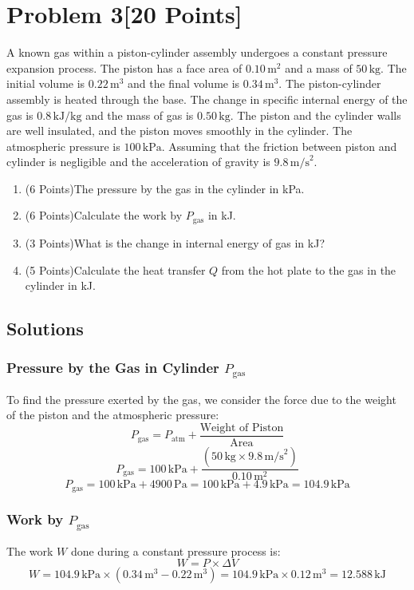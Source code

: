 \documentclass{article}
\begin{document}
\section*{Problem 3[20 Points]}
A known gas within a piston-cylinder assembly undergoes a constant pressure expansion process. The piston has a face area of \(0.10 \, \text{m}^2\) and a mass of \(50 \, \text{kg}\). The initial volume is \(0.22 \, \text{m}^3\) and the final volume is \(0.34 \, \text{m}^3\). The piston-cylinder assembly is heated through the base. The change in specific internal energy of the gas is \(0.8 \, \text{kJ/kg}\) and the mass of gas is \(0.50 \, \text{kg}\). The piston and the cylinder walls are well insulated, and the piston moves smoothly in the cylinder. The atmospheric pressure is \(100 \, \text{kPa}\). Assuming that the friction between piston and cylinder is negligible and the acceleration of gravity is \(9.8 \, \text{m/s}^2\).

\begin{enumerate}
    \item (6 Points)The pressure by the gas in the cylinder in kPa.
    \item (6 Points)Calculate the work by \(P_{\text{gas}}\) in kJ.
    \item (3 Points)What is the change in internal energy of gas in kJ?
    \item (5 Points)Calculate the heat transfer \(Q\) from the hot plate to the gas in the cylinder in kJ.
\end{enumerate}

\subsection*{Solutions}

\subsubsection*{Pressure by the Gas in Cylinder \(P_{\text{gas}}\)}
To find the pressure exerted by the gas, we consider the force due to the weight of the piston and the atmospheric pressure:
\[
P_{\text{gas}} = P_{\text{atm}} + \frac{\text{Weight of Piston}}{\text{Area}}
\]
\[
P_{\text{gas}} = 100 \, \text{kPa} + \frac{(50 \, \text{kg} \times 9.8 \, \text{m/s}^2)}{0.10 \, \text{m}^2}
\]
\[
P_{\text{gas}} = 100 \, \text{kPa} + 4900 \, \text{Pa} = 100 \, \text{kPa} + 4.9 \, \text{kPa} = 104.9 \, \text{kPa}
\]

\subsubsection*{Work by \(P_{\text{gas}}\)}
The work \(W\) done during a constant pressure process is:
\[
W = P \times \Delta V
\]
\[
W = 104.9 \, \text{kPa} \times (0.34 \, \text{m}^3 - 0.22 \, \text{m}^3) = 104.9 \, \text{kPa} \times 0.12 \, \text{m}^3 = 12.588 \, \text{kJ}
\]
\end{document}
